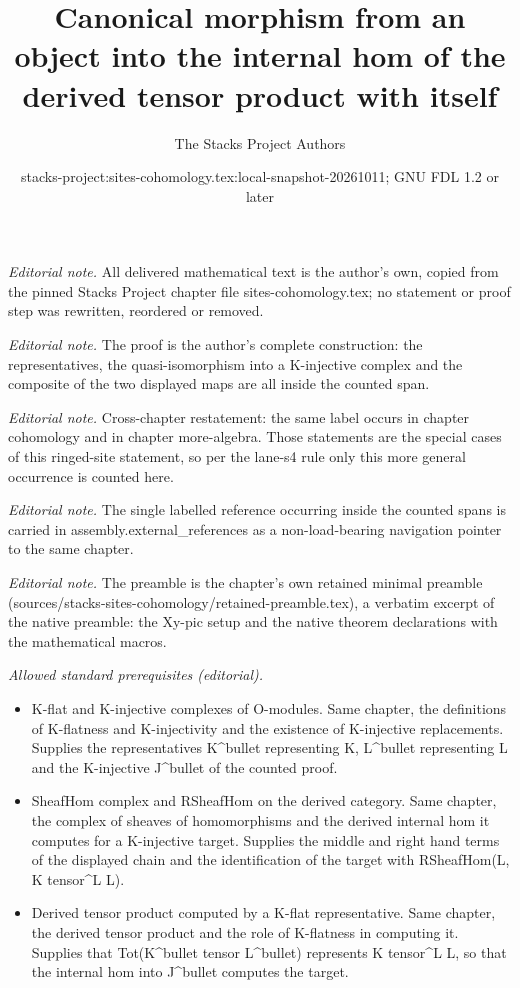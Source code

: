 \documentclass[10pt,a4paper]{amsart}
\title{Canonical morphism from an object into the internal hom of the derived tensor product with itself}
\author{The Stacks Project Authors}
\date{stacks-project:sites-cohomology.tex:local-snapshot-20261011; GNU FDL 1.2 or later}
\theoremstyle{plain}
\theoremstyle{definition}
\theoremstyle{remark}
\numberwithin{equation}{subsection}
\begin{document}
\maketitle
\noindent\textit{Editorial note.} All delivered mathematical text is the author's own, copied from the pinned Stacks Project chapter file sites-cohomology.tex; no statement or proof step was rewritten, reordered or removed.\par\medskip
\noindent\textit{Editorial note.} The proof is the author's complete construction: the representatives, the quasi-isomorphism into a K-injective complex and the composite of the two displayed maps are all inside the counted span.\par\medskip
\noindent\textit{Editorial note.} Cross-chapter restatement: the same label occurs in chapter cohomology and in chapter more-algebra. Those statements are the special cases of this ringed-site statement, so per the lane-s4 rule only this more general occurrence is counted here.\par\medskip
\noindent\textit{Editorial note.} The single labelled reference occurring inside the counted spans is carried in assembly.external\_references as a non-load-bearing navigation pointer to the same chapter.\par\medskip
\noindent\textit{Editorial note.} The preamble is the chapter's own retained minimal preamble (sources/stacks-sites-cohomology/retained-preamble.tex), a verbatim excerpt of the native preamble: the Xy-pic setup and the native theorem declarations with the mathematical macros.\par\medskip
\noindent\textit{Allowed standard prerequisites (editorial).}\begin{itemize}
\item K-flat and K-injective complexes of O-modules. Same chapter, the definitions of K-flatness and K-injectivity and the existence of K-injective replacements. Supplies the representatives K\textasciicircum{}bullet representing K, L\textasciicircum{}bullet representing L and the K-injective J\textasciicircum{}bullet of the counted proof.
\item SheafHom complex and RSheafHom on the derived category. Same chapter, the complex of sheaves of homomorphisms and the derived internal hom it computes for a K-injective target. Supplies the middle and right hand terms of the displayed chain and the identification of the target with RSheafHom(L, K tensor\textasciicircum{}L L).
\item Derived tensor product computed by a K-flat representative. Same chapter, the derived tensor product and the role of K-flatness in computing it. Supplies that Tot(K\textasciicircum{}bullet tensor L\textasciicircum{}bullet) represents K tensor\textasciicircum{}L L, so that the internal hom into J\textasciicircum{}bullet computes the target.
\end{itemize}\medskip
\end{document}
